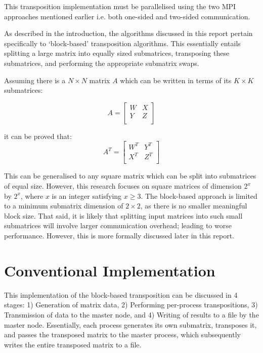 \documentclass[journal,10pt,a4paper]{IEEEtran}
\begin{document}
This transposition implementation must be parallelised using the two MPI approaches mentioned earlier i.e. both one-sided and two-sided communication.

As described in the introduction, the algorithms discussed in this report pertain specifically to `block-based' transposition algorithms. This essentially entails splitting a large matrix into equally sized submatrices, transposing these submatrices, and performing the appropriate submatrix swaps.

Assuming there is a $N\times N$ matrix $A$ which can be written in terms of its $K \times K$ submatrices:

\begin{equation}
A=
\begin{bmatrix}
    W       & X \\
   Y&Z \\
\end{bmatrix}
\end{equation}


it can be proved that:
\begin{equation}
    A^T=
\begin{bmatrix}
    W^T       & Y^T \\
   X^T&Z^T \\
\end{bmatrix}
\end{equation}



This can be generalised to any square matrix which can be split into submatrices of equal size. However, this research focuses on square matrices of dimension $2^x$ by $2^x$, where $x$ is an integer satisfying $x\geq 3$. The block-based approach is limited to a minimum submatrix dimension of $2\times 2$, as there is no smaller meaningful block size. That said, it is likely that splitting input matrices into such small submatrices will involve larger communication overhead; leading to worse performance. However, this is more formally discussed later in this report.




\section{Conventional Implementation}

This implementation of the block-based transposition can be discussed in 4 stages: 1) Generation of matrix data, 2) Performing per-process transpositions, 3) Transmission of data to the master node, and 4) Writing of results to a file by the master node. Essentially, each process generates its own submatrix, transposes it, and passes the transposed matrix to the master process, which subsequently writes the entire transposed matrix to a file.
\end{document}
